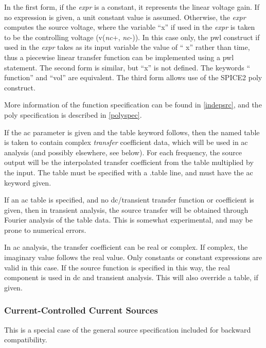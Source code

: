 In the first form, if the {\it expr} is a constant, it represents the
linear voltage gain.  If no expression is given, a unit constant
value is assumed.  Otherwise, the {\it expr} computes the source
voltage, where the variable ``{\vt x}'' if used in the {\it expr} is
taken to be the controlling voltage (v({\it nc\/}{\vt +},{\it
nc\/}{\vt -})).  In this case only, the {\vt pwl} construct if used
in the {\it expr} takes as its input variable the value of ``{\vt
x}'' rather than time, thus a piecewise linear transfer function can
be implemented using a {\vt pwl} statement.  The second form is
similar, but ``{\vt x}'' is not defined.  The keywords ``{\vt
function}'' and ``{\vt vol}'' are equivalent.  The third form allows
use of the SPICE2 {\vt poly} construct.

More information of the function specification can be found in
\ref{indepsrc}, and the {\vt poly} specification is described in
\ref{polyspec}.

If the {\vt ac} parameter is given and the {\vt table} keyword
follows, then the named table is taken to contain complex {\it
transfer} coefficient data, which will be used in ac analysis (and
possibly elsewhere, see below).  For each frequency, the source output
will be the interpolated transfer coefficient from the table
multiplied by the input.  The table must be specified with a {\vt
.table} line, and must have the {\vt ac} keyword given.

If an ac table is specified, and no dc/transient transfer function or
coefficient is given, then in transient analysis, the source transfer
will be obtained through Fourier analysis of the table data.  This is
somewhat experimental, and may be prone to numerical errors.

In ac analysis, the transfer coefficient can be real or complex.  If
complex, the imaginary value follows the real value.  Only constants
or constant expressions are valid in this case.  If the source
function is specified in this way, the real component is used in dc
and transient analysis.  This will also override a table, if given.

\subsubsection{Current-Controlled Current Sources}


This is a special case of the general source specification included
for backward compatibility.

